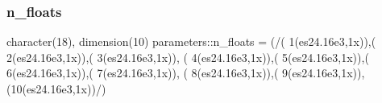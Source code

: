 \mbox{\label{group__FORMATS_ga75e55b6ae9f977f08dcde5798efa2520}} 
\subsubsection{\texorpdfstring{n\+\_\+floats}{n\_floats}}
{\footnotesize\ttfamily character(18), dimension(10) parameters\+::n\+\_\+floats = (/\textquotesingle{}( 1(es24.\+16e3,1x))\textquotesingle{},\textquotesingle{}( 2(es24.\+16e3,1x))\textquotesingle{},\textquotesingle{}( 3(es24.\+16e3,1x))\textquotesingle{}, \textquotesingle{}( 4(es24.\+16e3,1x))\textquotesingle{},\textquotesingle{}( 5(es24.\+16e3,1x))\textquotesingle{},\textquotesingle{}( 6(es24.\+16e3,1x))\textquotesingle{},\textquotesingle{}( 7(es24.\+16e3,1x))\textquotesingle{}, \textquotesingle{}( 8(es24.\+16e3,1x))\textquotesingle{},\textquotesingle{}( 9(es24.\+16e3,1x))\textquotesingle{},\textquotesingle{}(10(es24.\+16e3,1x))\textquotesingle{}/)}

